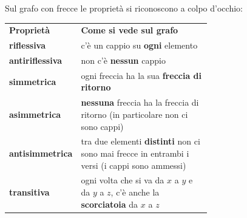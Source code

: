 
\begin{concetto}
Sul grafo con frecce le proprietà si riconoscono a colpo d'occhio:
\begin{center}
\renewcommand{\arraystretch}{1.35}
\begin{tabular}{>{\bfseries}l p{0.66\linewidth}}
    \rowcolor{primary!12} Proprietà & \textbf{Come si vede sul grafo} \\
    riflessiva & c'è un cappio su \textbf{ogni} elemento \\
    antiriflessiva & non c'è \textbf{nessun} cappio \\
    simmetrica & ogni freccia ha la sua \textbf{freccia di ritorno} \\
    asimmetrica & \textbf{nessuna} freccia ha la freccia di ritorno (in particolare non ci sono cappi) \\
    antisimmetrica & tra due elementi \textbf{distinti} non ci sono mai frecce in entrambi i versi (i cappi sono ammessi) \\
    transitiva & ogni volta che si va da $x$ a $y$ e da $y$ a $z$, c'è anche la \textbf{scorciatoia} da $x$ a $z$ \\
\end{tabular}
\end{center}
\end{concetto}


